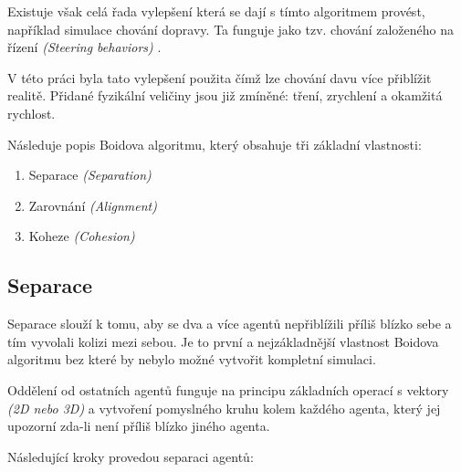 \documentclass[czech,public,dept460,male,cpdeclaration]{diploma}
\begin{document}
Existuje však celá řada vylepšení která se dají s tímto algoritmem provést, například simulace chování dopravy. Ta funguje jako tzv. chování založeného na řízení \textit{(Steering behaviors)} \cite{linkToSteeringBehaviors}. 

V této práci byla tato vylepšení použita čímž lze chování davu více přiblížit realitě. Přidané fyzikální veličiny jsou již zmíněné: tření, zrychlení a okamžitá rychlost.

\newpage
Následuje popis Boidova algoritmu, který obsahuje tři základní vlastnosti:

\begin{enumerate}
	\item Separace \textit{(Separation)}
	\item Zarovnání \textit{(Alignment)}
	\item Koheze \textit{(Cohesion)}
\end{enumerate}

\subsection{Separace}\label{sec:separace}
Separace slouží k tomu, aby se dva a více agentů nepřiblížili příliš blízko sebe a tím vyvolali kolizi mezi sebou. Je to první a nejzákladnější vlastnost Boidova algoritmu bez které by nebylo možné vytvořit kompletní simulaci. 

Oddělení od ostatních agentů funguje na principu základních operací s vektory \textit{(2D nebo 3D)} a vytvoření pomyslného kruhu kolem každého agenta, který jej upozorní zda-li není příliš blízko jiného agenta. 

Následující kroky provedou separaci agentů: 
\end{document}
